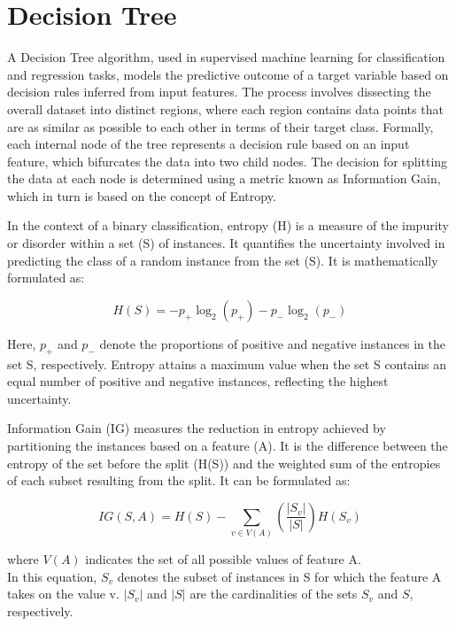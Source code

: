 \section{Decision Tree}
A Decision Tree algorithm, used in supervised machine learning for classification and regression tasks, models the predictive outcome of a target variable based on decision rules inferred from input features. The process involves dissecting the overall dataset into distinct regions, where each region contains data points that are as similar as possible to each other in terms of their target class. Formally, each internal node of the tree represents a decision rule based on an input feature, which bifurcates the data into two child nodes. The decision for splitting the data at each node is determined using a metric known as Information Gain, which in turn is based on the concept of Entropy.

In the context of a binary classification, entropy (H) is a measure of the impurity or disorder within a set (S) of instances. It quantifies the uncertainty involved in predicting the class of a random instance from the set (S). It is mathematically formulated as:

\begin{equation}
	H(S) = - p_{+} \log_{2}(p_{+}) - p_{-} \log_{2}(p_{-})
\end{equation}

Here, $p_+$ and $p_-$ denote the proportions of positive and negative instances in the set S, respectively. Entropy attains a maximum value when the set S contains an equal number of positive and negative instances, reflecting the highest uncertainty.

Information Gain (IG) measures the reduction in entropy achieved by partitioning the instances based on a feature (A). It is the difference between the entropy of the set before the split (H(S)) and the weighted sum of the entropies of each subset resulting from the split. It can be formulated as:

\begin{equation}
	IG(S, A) = H(S) - \sum_{v \in V(A)} \left(\frac{|S_v|}{|S|}\right) H(S_v)
\end{equation}

where $V(A)$ indicates the set of all possible values of feature A.\\
In this equation, $S_v$ denotes the subset of instances in S for which the feature A takes on the value v. $|S_v|$ and $|S|$ are the cardinalities of the sets $S_v$ and $S$, respectively.\\

